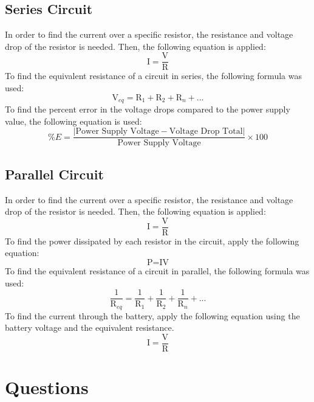 \documentclass[titlepage]{article}
\begin{document}
        \subsection{Series Circuit} 
	In order to find the current over a specific resistor, the resistance and voltage drop of the resistor is needed. Then, the following equation is applied:
\[ \text{I} = \frac{\text{V}}{\text{R}} \]
To find the equivalent resistance of a circuit in series, the following formula was used:
\[\text{V}_{eq} = \text{R}_{1} + \text{R}_2 + \text{R}_n + ... \]
To find the percent error in the voltage drops compared to the power supply value, the following equation is used:
\[\%E = \frac{|\text{Power Supply Voltage} - \text{Voltage Drop Total}|}{\text{Power Supply Voltage}} \times 100\]

	\subsection{Parallel Circuit}
	In order to find the current over a specific resistor, the resistance and voltage drop of the resistor is needed. Then, the following equation is applied:
\[ \text{I} = \frac{\text{V}}{\text{R}} \]
	To find the power dissipated by each resistor in the circuit, apply the following equation:
	\[ \text{P} = \text{IV}\]
	To find the equivalent resistance of a circuit in parallel, the following formula was used:
	\[\frac{1}{\text{R}_{eq}} = \frac{1}{\text{R}_1} + \frac{1}{\text{R}_2} + \frac{1}{\text{R}_n} + ... \]
	To find the current through the battery, apply the following equation using the battery voltage and the equivalent resistance.
\[ \text{I} = \frac{\text{V}}{\text{R}} \]


\section{Questions}
\end{document}
